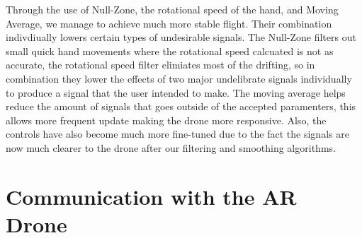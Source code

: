 \documentclass[letterpaper,english, 12pt]{article}
\begin{document}
Through the use of Null-Zone, the rotational speed of the hand, and Moving Average, we manage to achieve much more stable flight. Their combination indivdiually lowers certain types of undesirable signals. The Null-Zone filters out small quick hand movements where the rotational speed calcuated is not as accurate, the rotational speed filter elimiates most of the drifting, so in combination they lower the effects of two major undelibrate signals individually to produce a signal that the user intended to make. The moving average helps reduce the amount of signals that goes outside of the accepted paramenters, this allows more frequent update making the drone more responsive. Also, the controls have also become much more fine-tuned due to the fact the signals are now much clearer to the drone after our filtering and smoothing algorithms.  

\section*{Communication with the AR Drone}
\end{document}

